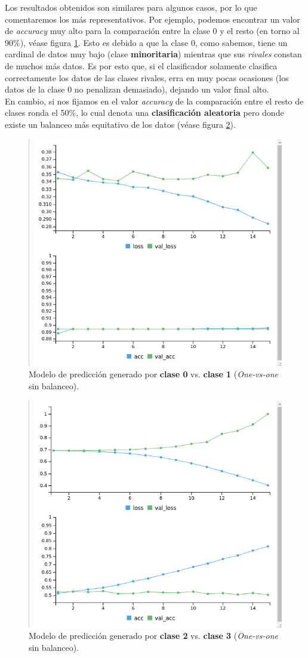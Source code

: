 \documentclass[]{article}
\begin{document}
		Los resultados obtenidos son similares para algunos casos, por lo que comentaremos los más representativos. Por ejemplo, podemos encontrar un valor de \textit{accuracy} muy alto para la comparación entre la clase 0 y el resto (en torno al 90\%), véase figura \ref{ovo-01}. Esto es debido a que la clase 0, como sabemos, tiene un cardinal de datos muy bajo (clase \textbf{minoritaria}) mientras que sus \textit{rivales} constan de muchos más datos. Es por esto que, si el clasificador solamente clasifica correctamente los datos de las clases rivales, erra en muy pocas ocasiones (los datos de la clase 0 no penalizan demasiado), dejando un valor final alto.\\
		
		En cambio, si nos fijamos en el valor \textit{accuracy} de la comparación entre el resto de clases ronda el 50\%, lo cual denota una \textbf{clasificación aleatoria} pero donde existe un balanceo más equitativo de los datos (véase figura \ref{ovo-23}).\\
	
		\begin{figure}[h]
			\centering
			\includegraphics[width=0.6\columnwidth]{./img/OVO_01}
			\caption{Modelo de predicción generado por \textbf{clase 0} vs. \textbf{clase 1} (\textit{One-vs-one} sin balanceo).}
			\label{ovo-01}
		\end{figure}
	
		\begin{figure}[h]
			\centering
			\includegraphics[width=0.6\columnwidth]{./img/OVO_23}
			\caption{Modelo de predicción generado por \textbf{clase 2} vs. \textbf{clase 3} (\textit{One-vs-one} sin balanceo).}
			\label{ovo-23}
		\end{figure}
	
\end{document}
